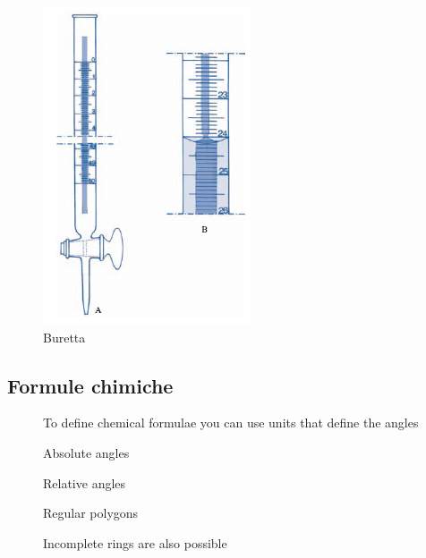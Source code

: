 \begin{figure}[h]
    \centering
    \includegraphics{img/buretta.jpg}
    \caption{Buretta}
    \label{fig:5}
\end{figure}

\newpage
\subsection*{Formule chimiche}
\begin{figure}[!ht]
\end{figure}

\begin{figure}[!ht]
    \caption{To define chemical formulae you can use units that define the angles}
\end{figure}

\begin{figure}[!ht]
    \caption{Absolute angles}
\end{figure}


\begin{figure}[!ht]
    \caption{Relative angles}
\end{figure}


\begin{figure}[!ht]
    \caption{Regular polygons}
\end{figure}

\begin{figure}[!ht]
    \caption{Incomplete rings are also possible}
\end{figure}

